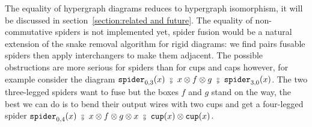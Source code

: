 The equality of hypergraph diagrams reduces to hypergraph isomorphism, it will be discussed in section~\ref{section:related and future}.
The equality of non-commutative spiders is not implemented yet, spider fusion would be a natural extension of the snake removal algorithm for rigid diagrams: we find pairs fusable spiders then apply interchangers to make them adjacent.
The possible obstructions are more serious for spiders than for cups and caps however, for example consider the diagram $\spider_{0, 3}(x) \ \fcmp \ x \otimes f \otimes g \ \fcmp \ \spider_{3, 0}(x)$.
The two three-legged spiders want to fuse but the boxes $f$ and $g$ stand on the way, the best we can do is to bend their output wires with two cups and get a four-legged spider $\spider_{0, 4}(x) \ \fcmp \ x \otimes f \otimes g \otimes x \ \fcmp \ \ttcup(x) \otimes \ttcup(x)$.

